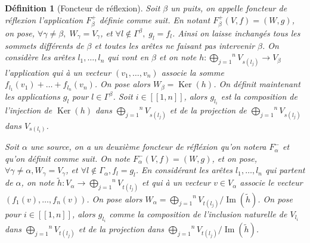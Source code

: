 \documentclass[a4paper,11pt]{article}
\newtheorem{defi}[thm]{Définition}%
\DeclareMathOperator{\Ker}{Ker}
\DeclareMathOperator{\Img}{Im}
\begin{document}
\begin{defi}[Foncteur de réflexion]
	Soit $\beta$ un puits, on appelle \emph{foncteur de réflexion} l'application $F_{\beta}^{+}$ définie comme suit. En notant $F_{\beta}^{+}(V,f)=(W,g)$, on pose, $\forall \gamma\neq\beta,\;W_{\gamma}=V_{\gamma}$, et $\forall l \notin \Gamma^{\beta},\; g_{l}=f_{l}$. Ainsi on laisse inchangés tous les sommets différents de $\beta$ et toutes les arêtes ne faisant pas intervenir $\beta$. On considère les arêtes $l_{1},\dots,l_{n}$ qui vont en $\beta$ et on note $h:\overset{n}{\underset{j=1}{\bigoplus}}V_{s(l_{j})}\rightarrow V_{\beta}$ l'application qui à un vecteur $(v_{1},\dots,v_{n})$ associe la somme $f_{l_{1}}(v_{1})+\dots+f_{l_{n}}(v_{n})$. On pose alors $W_{\beta}=\Ker(h)$. On définit maintenant les applications $g_{l}$ pour $l\in\Gamma^{\beta}$. Soit $i\in[\![1,n]\!]$, alors $g_{l_{i}}$ est la composition de l'injection de $\Ker(h)$ dans $\overset{n}{\underset{j=1}{\bigoplus}}V_{s(l_{j})}$ et de la projection de $\overset{n}{\underset{j=1}{\bigoplus}}V_{s(l_{j})}$ dans $V_{s(l_{i})}$. 

	Soit $\alpha$ une source, on a un deuxième \emph{foncteur de réfléxion} qu'on notera $F^{-}_{\alpha}$ et qu'on définit comme suit. On note $F^{-}_{\alpha}(V,f) = (W,g)$, et on pose, $\forall \gamma \neq \alpha, W_\gamma = V_\gamma$, et $\forall l \notin \Gamma_\alpha, f_l = g_l$. En considérant les arêtes $l_1, \dots, l_n$ qui partent de $\alpha$, on note $\widetilde{h} : V_\alpha \rightarrow \overset{n}{\underset{j=1}{\bigoplus}}V_{t(l_{j})}$ et qui à un vecteur $v \in V_\alpha$ associe le vecteur $(f_1(v),\dots, f_n(v))$. On pose alors $W_\alpha = \overset{n}{\underset{j=1}{\bigoplus}}V_{t(l_{j})}/\Img(\widetilde{h})$. On pose pour $i\in [\![1,n]\!]$, alors $g_{l_i}$ comme la composition de l'inclusion naturelle de $V_{l_i}$ dans $\overset{n}{\underset{j=1}{\bigoplus}}V_{t(l_{j})}$ et de la projection dans $\overset{n}{\underset{j=1}{\bigoplus}}V_{t(l_{j})}/\Img(\widetilde h)$.

\end{defi}
\end{document}
